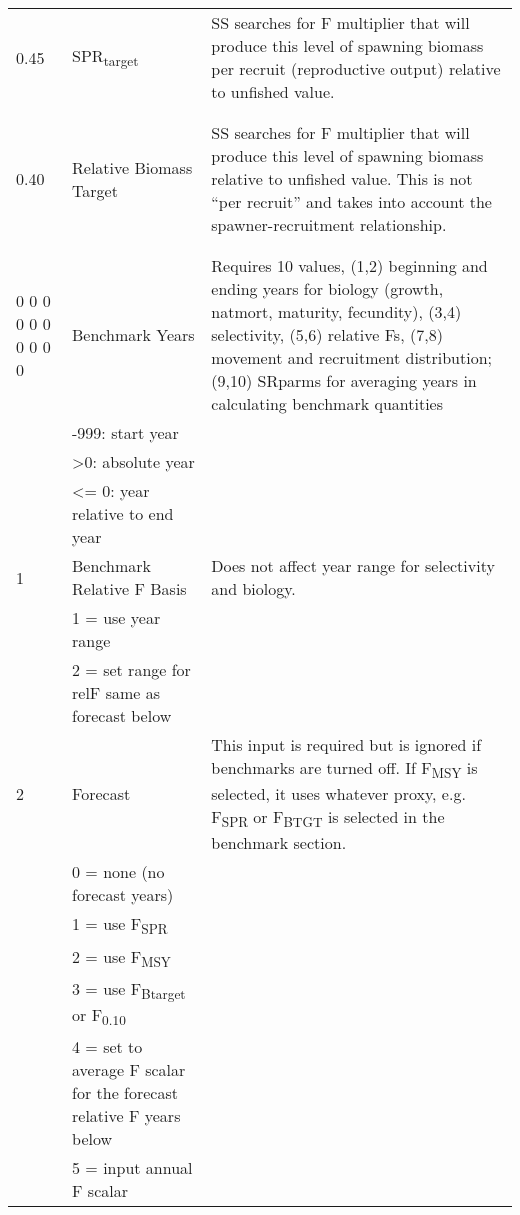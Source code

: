 \begin{landscape}
{\begin{longtable}{p{3.2cm} p{7cm} p{10.8cm}}
 \hline
 0.45 & SPR\textsubscript{target} &  \multirow{1}{1cm}[-0.25cm]{\parbox{11cm }{ SS searches for F multiplier that will produce this level of spawning biomass per recruit (reproductive output) relative to unfished value.}} \Tstrut\\
      & & \\
      & & \\
 
 \hline
 0.40 & Relative Biomass Target & \multirow{1}{1cm}[-0.25cm]{\parbox{11cm }{ SS searches for F multiplier that will produce this level of spawning biomass relative to unfished value.  This is not “per recruit” and takes into account the spawner-recruitment relationship.}} \Tstrut\\
      & & \Bstrut\\
      & & \Bstrut\\
  
 \hline
 0 0 0 0 0 0 0 0 0 0 & Benchmark Years & \multirow{1}{1cm}[-0.25cm]{\parbox{11cm }{ Requires 10 values, (1,2) beginning and ending years for biology (growth, natmort, maturity, fecundity), (3,4) selectivity, (5,6) relative Fs, (7,8) movement and recruitment distribution; (9,10) SRparms for averaging years in calculating benchmark quantities}} \Tstrut\\
  & -999: start year & \\
  & >0:   absolute year & \\
  & <= 0: year relative to end year & \\


  \pagebreak
  1 & Benchmark Relative F Basis &  \multirow{1}{1cm}[-0.25cm]{\parbox{11cm }{ Does not affect year range for selectivity and biology.}} \Tstrut\\
    & 1 = use year range & \\
    & 2 = set range for relF same as forecast below & \\
    
  \hline
  2 & Forecast & \multirow{1}{1cm}[-0.25cm]{\parbox{11cm }{ This input is required but is ignored if benchmarks are turned off.  If F\textsubscript{MSY} is selected, it uses whatever proxy, e.g. F\textsubscript{SPR} or F\textsubscript{BTGT} is selected in the benchmark section.}} \Tstrut\\
    & 0 = none (no forecast years) & \\
    & 1 = use F\textsubscript{SPR} & \\
    & 2 = use F\textsubscript{MSY} & \\
    & 3 = use F\textsubscript{Btarget} or F\textsubscript{0.10} & \\
    & 4 = set to average F scalar for the forecast relative F years below & \\
    & 5 = input annual F scalar & \Bstrut\\
    

\end{longtable}}
\end{landscape}
